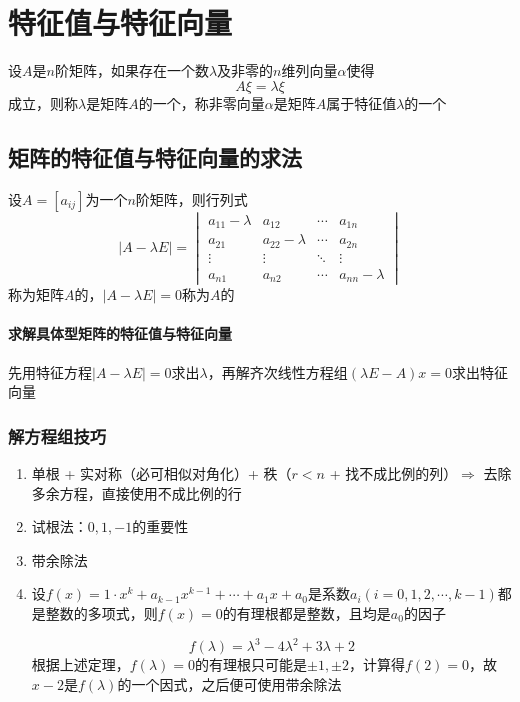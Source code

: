 \documentclass[./linear_algebra.tex]{subfiles}
\begin{document}
    \section{特征值与特征向量}

    设$A$是$n$阶矩阵，如果存在一个数$\lambda$及非零的$n$维列向量$\alpha$使得
    \[
        A\xi = \lambda\xi
    \]
    成立，则称$\lambda$是矩阵$A$的一个{\color[rgb]{0.2, 0.6, 0.3}{特征值}}，称非零向量$\alpha$是矩阵$A$属于特征值$\lambda$的一个{\color[rgb]{0.2, 0.6, 0.3}{特征向量}}

    \subsection{矩阵的特征值与特征向量的求法}

    设$A = [a_{ij}]$为一个$n$阶矩阵，则行列式
    \[
        |A - \lambda E| = \begin{vmatrix}
                              a_{11} - \lambda & a_{12}           & \cdots & a_{1n}           \\
                              a_{21}           & a_{22} - \lambda & \cdots & a_{2n}           \\
                              \vdots           & \vdots           & \ddots & \vdots           \\
                              a_{n1}           & a_{n2}           & \cdots & a_{nn} - \lambda
        \end{vmatrix}
    \]
    称为矩阵$A$的{\color[rgb]{0.2, 0.6, 0.3}{特征多项式}}，$|A - \lambda E| = 0$称为$A$的{\color[rgb]{0.2, 0.6, 0.3}{特征方程}}

    \paragraph{求解具体型矩阵的特征值与特征向量}

    先用特征方程$|A - \lambda E| = 0$求出$\lambda$，再解齐次线性方程组$(\lambda E - A)x = 0$求出特征向量

    \subsubsection{解方程组技巧}

    \begin{enumerate}
        \item 单根 + 实对称（必可相似对角化）+ 秩（$r < n$ + 找不成比例的列）$\Rightarrow$ 去除多余方程，直接使用不成比例的行
        \item 试根法：$0, 1, -1$的重要性
        \item 带余除法
        \item 设$f(x) = 1\cdot x^k + a_{k-1}x^{k-1} + \cdots + a_{1}x + a_0$是系数$a_i(i = 0, 1, 2, \cdots, k-1)$都是整数的多项式，则$f(x) = 0$的有理根都是整数，且均是$a_0$的因子
        \begin{analysisbox}
            \[
                f(\lambda) = \lambda^3 - 4\lambda^2 + 3\lambda + 2
            \]
            根据上述定理，$f(\lambda) = 0$的有理根只可能是$\pm 1, \pm 2$，计算得$f(2) = 0$，故$x-2$是$f(\lambda)$的一个因式，之后便可使用带余除法
        \end{analysisbox}
    \end{enumerate}
\end{document}
